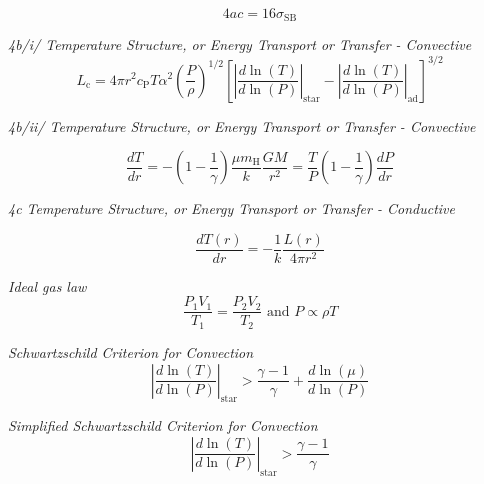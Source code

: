 \documentclass{spy}
\begin{document}
\begin{equation}
4ac = 16 \sigma_\mathrm{SB}
\end{equation}

\textit {4b/i/ Temperature Structure, or Energy Transport or Transfer - Convective}
\begin{equation}
L_\mathrm{c} = 4 \pi r^2 c_\mathrm{P} T \alpha^2 \left(\frac{P}{\rho}\right)^{1/2} \left[\left| \frac {d\ln(T)}{d\ln(P)} \right |_\mathrm{star} - \left| \frac {d\ln(T)}{d\ln(P)} \right |_\mathrm{ad}  \right]^{3/2}
\end{equation}

\textit {4b/ii/ Temperature Structure, or Energy Transport or Transfer - Convective}


\begin{equation}
\frac{dT}{dr} = - \left( 1 - \frac{1}{\gamma} \right) \frac{\mu m_\mathrm{H}}{k} \frac{G M}{r^2} = \frac{T}{P} \left( 1 - \frac{1}{\gamma} \right) \frac{dP}{dr}
\end{equation}

\textit {4c Temperature Structure, or Energy Transport or Transfer - Conductive}


\begin{equation}
\frac{dT(r)}{dr} = - \frac{1}{k} \frac{L(r)}{4 \pi r^2}
\end{equation}



\textit{Ideal gas law}
\begin{equation}
\frac{P_1 V_1}{T_1} = \frac{P_2 V_2}{T_2} \text{ and } P \propto \rho T
\end{equation}

\textit {Schwartzschild Criterion for Convection}
\begin{equation}
\left| \frac {d\ln(T)}{d\ln(P)} \right |_\mathrm{star} > \frac {\gamma -1}{\gamma} + \frac {d\ln(\mu)}{d\ln(P)}
\end{equation}




\textit{Simplified Schwartzschild Criterion for Convection}
\begin{equation}
\left| \frac {d\ln(T)}{d\ln(P)} \right |_\mathrm{star} > \frac {\gamma -1}{\gamma}
\end{equation}
\end{document}
